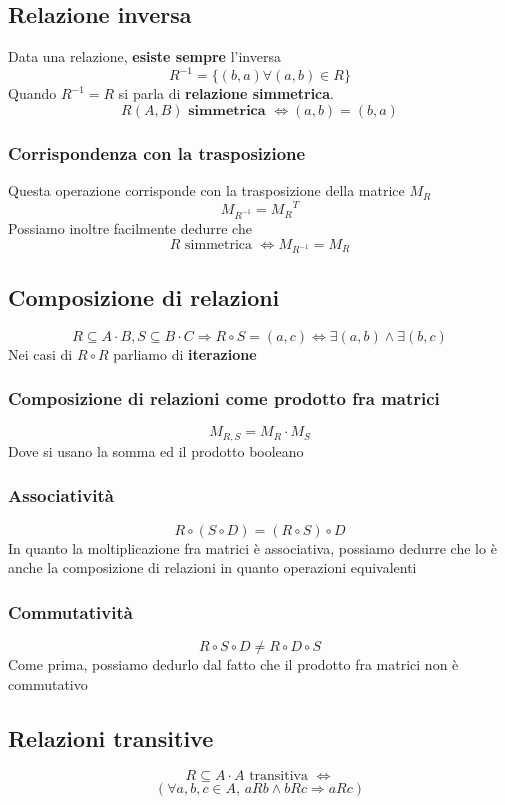 \documentclass{report}
\begin{document}
    \subsection{Relazione inversa}
        Data una relazione, \textbf{esiste sempre} l'inversa 
        $$R^{-1}=\{\left(b, a\right) \forall \left(a, b\right) \in R\}$$ 
        Quando $R^{-1} = R$ si parla di \textbf{relazione simmetrica}. 
        $$R\left(A, B\right) \textbf{ simmetrica } \Longleftrightarrow \left(a, b\right) = \left(b, a\right)$$
        \subsubsection{Corrispondenza con la trasposizione}
            Questa operazione corrisponde con la trasposizione della matrice $M_R$
            $$M_{R^{-1}} = {M_R}^T$$
            Possiamo inoltre facilmente dedurre che
            $$R \textrm{ simmetrica } \Longleftrightarrow M_{R^{-1}} = M_R$$
    \subsection{Composizione di relazioni}
        $$R \subseteq A \cdot B, S \subseteq B \cdot C \Longrightarrow R \circ S = 
        \left(a, c\right) \Longleftrightarrow \exists\left(a, b\right) \wedge \exists \left(b, c\right)$$
        Nei casi di $R \circ R$ parliamo di \textbf{iterazione}
        \subsubsection{Composizione di relazioni come prodotto fra matrici}
            $$M_{R,S} = M_R \cdot M_S$$
            Dove si usano la somma ed il prodotto booleano
        \subsubsection{Associatività}
            $$ R \circ \left(S \circ D\right) = \left(R \circ S\right) \circ D$$
            In quanto la moltiplicazione fra matrici è associativa, possiamo dedurre
            che lo è anche la composizione di relazioni in quanto operazioni equivalenti
        \subsubsection{Commutatività}
            $$ R \circ S \circ D \neq R \circ D \circ S $$
            Come prima, possiamo dedurlo dal fatto che il prodotto fra matrici non è
            commutativo
    \subsection{Relazioni transitive}
        $$R \subseteq A \cdot A \textrm{ transitiva } \Longleftrightarrow$$
        $$\left(\forall a, b, c \in A, \, aRb \wedge bRc \Longrightarrow aRc\right)$$
\end{document}

